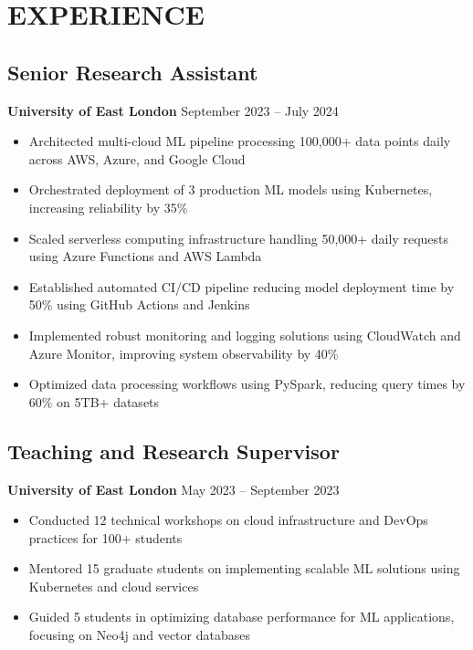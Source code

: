 \documentclass[10pt,a4paper]{article}
\begin{document}
\section*{EXPERIENCE}

\subsection*{Senior Research Assistant}
\textbf{University of East London} \hfill September 2023 -- July 2024
\begin{itemize}
    \item Architected multi-cloud ML pipeline processing 100,000+ data points daily across AWS, Azure, and Google Cloud
    \item Orchestrated deployment of 3 production ML models using Kubernetes, increasing reliability by 35\%
    \item Scaled serverless computing infrastructure handling 50,000+ daily requests using Azure Functions and AWS Lambda
    \item Established automated CI/CD pipeline reducing model deployment time by 50\% using GitHub Actions and Jenkins
    \item Implemented robust monitoring and logging solutions using CloudWatch and Azure Monitor, improving system observability by 40\%
    \item Optimized data processing workflows using PySpark, reducing query times by 60\% on 5TB+ datasets
\end{itemize}

\subsection*{Teaching and Research Supervisor}
\textbf{University of East London} \hfill May 2023 -- September 2023
\begin{itemize}
    \item Conducted 12 technical workshops on cloud infrastructure and DevOps practices for 100+ students
    \item Mentored 15 graduate students on implementing scalable ML solutions using Kubernetes and cloud services
    \item Guided 5 students in optimizing database performance for ML applications, focusing on Neo4j and vector databases
\end{itemize}
\end{document}
